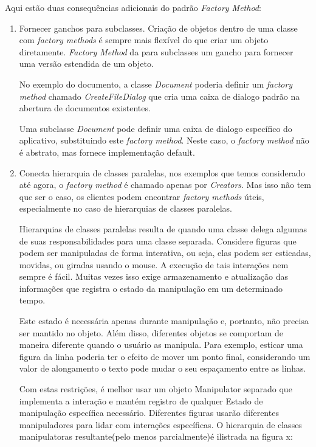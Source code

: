 Aqui estão duas consequências adicionais do padrão \emph{Factory Method}:

\begin{enumerate}
	\item Fornecer ganchos para subclasses. Criação de objetos dentro de uma classe com \emph{factory methods} é sempre mais flexível do que criar um objeto diretamente. \emph{Factory Method} da para subclasses um gancho para fornecer uma versão estendida
de um objeto.

No exemplo do documento, a classe \emph{Document} poderia definir um \emph{factory method} chamado \emph{CreateFileDialog} que cria uma caixa de dialogo padrão na abertura de documentos existentes.

Uma subclasse \emph{Document} pode definir uma caixa de dialogo específico do aplicativo, substituindo este \emph{factory method}. Neste caso, o \emph{factory method} não é abstrato, mas fornece implementação default.

	\item
Conecta hierarquia de classes paralelas, nos exemplos que temos considerado até agora, o \emph{factory method} é chamado apenas por \emph{Creators}. Mas isso não tem que ser o caso, os clientes podem encontrar \emph{factory methods} úteis, especialmente no caso de hierarquias de classes paralelas.

Hierarquias de classes paralelas resulta de quando uma classe delega algumas de suas responsabilidades para uma classe separada.
Considere figuras que podem ser manipuladas de forma interativa, ou seja, elas podem ser esticadas, movidas, ou giradas usando o mouse. A execução de tais interações nem sempre é fácil. Muitas vezes isso exige armazenamento e atualização das informações que registra o estado da manipulação em um determinado tempo.

Este estado é necessária apenas durante manipulação e, portanto, não precisa ser mantido no objeto. Além disso, diferentes objetos se comportam de maneira diferente quando o usuário as manipula. Para exemplo, esticar uma figura da linha poderia ter o efeito de mover um ponto final, considerando um valor de alongamento o texto pode mudar o seu espaçamento entre as linhas.

Com estas restrições, é melhor usar um objeto Manipulator separado que implementa a interação e mantém registro de qualquer
Estado de manipulação específica necessário. 
Diferentes figuras usarão diferentes manipuladores para lidar com interações específicas. O hierarquia de classes manipulatoras resultante(pelo menos parcialmente)é ilistrada na figura x:

\end{enumerate}

